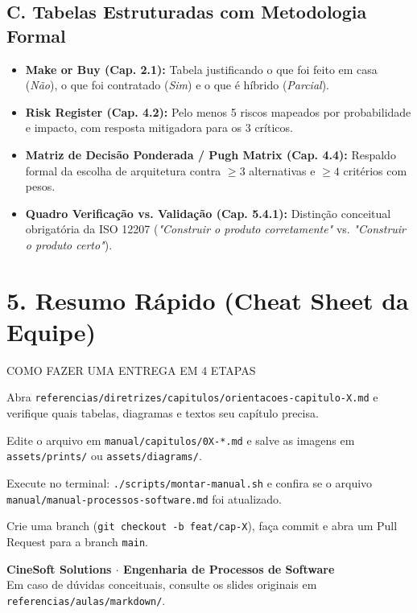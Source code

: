 \documentclass[11pt,a4paper]{article}
\begin{document}
\subsection*{C. Tabelas Estruturadas com Metodologia Formal}
\begin{itemize}
  \item \textbf{Make or Buy (Cap. 2.1):} Tabela justificando o que foi feito em casa (\textit{Não}), o que foi contratado (\textit{Sim}) e o que é híbrido (\textit{Parcial}).
  \item \textbf{Risk Register (Cap. 4.2):} Pelo menos 5 riscos mapeados por probabilidade e impacto, com resposta mitigadora para os 3 críticos.
  \item \textbf{Matriz de Decisão Ponderada / Pugh Matrix (Cap. 4.4):} Respaldo formal da escolha de arquitetura contra $\ge 3$ alternativas e $\ge 4$ critérios com pesos.
  \item \textbf{Quadro Verificação vs. Validação (Cap. 5.4.1):} Distinção conceitual obrigatória da ISO 12207 (\textit{"Construir o produto corretamente"} vs. \textit{"Construir o produto certo"}).
\end{itemize}

\section{5. Resumo Rápido (Cheat Sheet da Equipe)}

\begin{caixaInfo}{COMO FAZER UMA ENTREGA EM 4 ETAPAS}
\begin{description}[leftmargin=1.5cm, style=nextline]
  \item[\textbf{1. Planejar}] Abra \texttt{referencias/diretrizes/capitulos/orientacoes-capitulo-X.md} e verifique quais tabelas, diagramas e textos seu capítulo precisa.
  \item[\textbf{2. Produzir}] Edite o arquivo em \texttt{manual/capitulos/0X-*.md} e salve as imagens em \texttt{assets/prints/} ou \texttt{assets/diagrams/}.
  \item[\textbf{3. Montar}] Execute no terminal: \texttt{./scripts/montar-manual.sh} e confira se o arquivo \texttt{manual/manual-processos-software.md} foi atualizado.
  \item[\textbf{4. Versionar}] Crie uma branch (\texttt{git checkout -b feat/cap-X}), faça commit e abra um Pull Request para a branch \texttt{main}.
\end{description}
\end{caixaInfo}

\vspace{0.4cm}
\begin{center}
  \small\color{cinzaMedio}
  \textbf{CineSoft Solutions $\cdot$ Engenharia de Processos de Software}\\
  Em caso de dúvidas conceituais, consulte os slides originais em \texttt{referencias/aulas/markdown/}.
\end{center}
\end{document}
